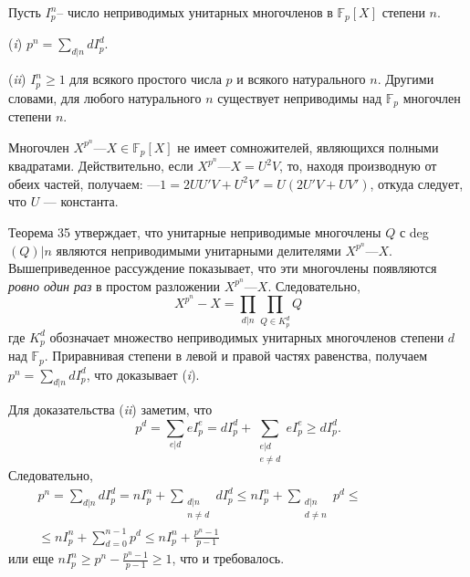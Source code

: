 \documentclass{mai_book}
\begin{document}
\begin{sled}
\hspace*{15pt}Пусть $I^n_p$-- число неприводимых унитарных многочленов в $\mathbb{F}_p[X]$
степени $n$.

\newpage

\hspace*{15pt}(\textit{i}) $p^n = \sum\limits_{d|n}dI^d_p$.

\hspace*{15pt}(\textit{ii}) $I^n_p \geqslant 1$ для всякого простого числа $p$ и всякого натурального $n$.
Другими словами, для любого натурального $n$ существует неприводимы над $\mathbb{F}_p$ многочлен степени $n$.\newline
\end{sled}

\begin{myproof}
Многочлен $X^{p^n} — X \in \mathbb{F}_p[X]$ не имеет сомножителей, являющихся 
полными квадратами. Действительно, если $X^{p^n} — X = U^2V$, то, 
находя производную от обеих частей, получаем: $— 1 = 2UU'V + 
U^2V' = U(2U'V + UV')$, откуда следует, что $U$ — константа.
 
\noindent Теорема 35 утверждает, что унитарные неприводимые многочлены 
$Q$ с deg$(Q) | n$ являются неприводимыми унитарными делителями 
$X^{p^n} — X$. Вышеприведенное рассуждение показывает, что эти  
многочлены появляются \textit{ровно один раз} в простом разложении $X^{p^n} — X$. 
Следовательно,
\begin{equation*}
X^{p^n} - X =  \prod_{d|n} \prod_{Q\in K^d_p}Q
\end{equation*}
где $K^d_p$ обозначает множество неприводимых унитарных  
многочленов степени $d$ над $\mathbb{F}_p$. Приравнивая степени в левой и правой частях 
равенства, получаем $p^n = \sum_{d|n} dI^d_p$, что доказывает (\textit{i}). 

\noindent Для доказательства (\textit{ii}) заметим, что
\begin{equation*}
p^d = \sum_{e|d}eI^e_p = dI^d_p + \sum_{\substack{e|d{}\\e\neq d}}eI^e_p \geqslant dI^d_p.
\end{equation*}
Следовательно,
\begin{eqnarray*}
p^n = \sum_{d|n}dI^d_p = nI^n_p + \sum_{\substack{d|n\\n\neq d}}dI^d_p \leqslant nI^n_p + \sum_{\substack{d|n{}\\d\neq n}}p^d \leqslant \qquad\qquad\qquad\\
\leqslant nI^n_p + \sum^{n-1}_{d = 0}p^d \leqslant nI^n_p + \frac{p^n - 1}{p - 1}\:\:
\end{eqnarray*}
или еще $nI^n_p \geqslant p^n - \frac{p^n - 1}{p - 1} \geqslant 1$, что и требовалось.
\end{myproof}
\newpage
\end{document}
